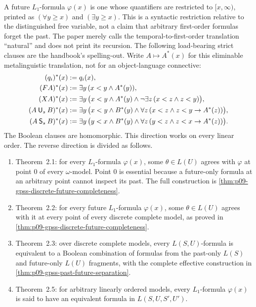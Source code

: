 A future \(L_1\)-formula \(\varphi(x)\) is one whose quantifiers are restricted
to \([x,\infty)\), printed as \((\forall y\ge x)\) and
\((\exists y\ge x)\).  This is a syntactic restriction relative to the
distinguished free variable, not a claim that arbitrary first-order formulas
forget the past.  The paper merely calls the temporal-to-first-order
translation ``natural'' and does not print its recursion.  The following
load-bearing strict clauses are the handbook's spelling-out.  Write
\(A\mapsto A^*(x)\) for this eliminable metalinguistic translation, not for an
object-language connective:
\[
\begin{aligned}
 (q_i)^*(x)
   &\mathrel{:=} q_i(x),\\
 (FA)^*(x)
   &\mathrel{:=} \exists y\,(x<y\land A^*(y)),\\
 (XA)^*(x)
   &\mathrel{:=} \exists y\,
      \bigl(x<y\land A^*(y)\land
        \neg\exists z\,(x<z\land z<y)\bigr),\\
 (A\mathbin{\mathsf U_s}B)^*(x)
   &\mathrel{:=} \exists y\,
       \bigl(x<y\land B^*(y)\land
         \forall z\,(x<z\land z<y\to A^*(z))\bigr),\\
 (A\mathbin{\mathsf S_s}B)^*(x)
   &\mathrel{:=} \exists y\,
       \bigl(y<x\land B^*(y)\land
         \forall z\,(y<z\land z<x\to A^*(z))\bigr).
\end{aligned}
\]
The Boolean clauses are homomorphic.
This direction works on every linear order.  The reverse direction is divided
as follows.

\begin{enumerate}
\item Theorem~2.1: for every \(L_1\)-formula \(\varphi(x)\), some
  \(\theta\in L(U)\) agrees with \(\varphi\) at point \(0\) of every
  \(\omega\)-model.  Point \(0\) is essential because a future-only formula at
  an arbitrary point cannot inspect its past. The full construction is
  \cref{thm:p09-gpss-discrete-future-completeness}.
\item Theorem~2.2: for every future \(L_1\)-formula \(\varphi(x)\), some
  \(\theta\in L(U)\) agrees with it at every point of every discrete complete
  model, as proved in \cref{thm:p09-gpss-discrete-future-completeness}.
\item Theorem~2.3: over discrete complete models, every \(L(S,U)\)-formula is
  equivalent to a Boolean combination of formulas from the past-only
  \(L(S)\) and future-only \(L(U)\) fragments, with the complete
  effective construction in \cref{thm:p09-gpss-past-future-separation}.
\item Theorem~2.5: for arbitrary linearly ordered models, every
  \(L_1\)-formula \(\varphi(x)\) is said to have an equivalent formula in
  \(L(S,U,S',U')\).
\end{enumerate}

